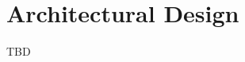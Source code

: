 \documentclass[main.tex]{subfiles}
\begin{document}
	\section{Architectural Design}
	
	TBD
	
\end{document}

